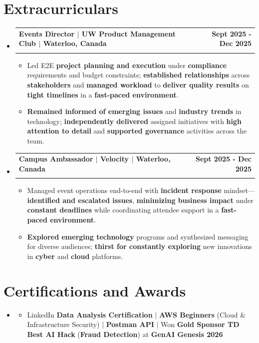 \documentclass[letterpaper,10pt]{article}
\makeatletter
\newcommand{\resumeItem}[1]{
  \item\small{
    {#1 \vspace{-1pt}}
  }
}
\newcommand{\resumeSubheading}[4]{
  \vspace{-1pt}\item
    \begin{tabular*}{1.0\textwidth}[t]{l@{\extracolsep{\fill}}r}
      \textbf{#1} & \textbf{\small #2} \\
      \textit{\small#3} & \textit{\small #4} \\[-2pt]
    \end{tabular*}\vspace{-7pt}
}
\newcommand{\resumeSubHeadingListStart}{\begin{itemize}[leftmargin=0.0in, label={}]}
\newcommand{\resumeSubHeadingListEnd}{\end{itemize}}
\newcommand{\resumeItemListStart}{\begin{itemize}[leftmargin=0.15in]}
\newcommand{\resumeItemListEnd}{\end{itemize}\vspace{-4pt}}
\makeatother
\begin{document}
\section{Extracurriculars}
  \resumeSubHeadingListStart
    \resumeSubheading
      {Events Director $|$ UW Product Management Club $|$ Waterloo, Canada}{Sept 2025 - Dec 2025}
      {}{}
      \vspace{-13pt}
      \resumeItemListStart
      \vspace{-2pt}
        \resumeItem{Led E2E \textbf{project planning and execution} under \textbf{compliance} requirements and budget constraints; \textbf{established relationships} across \textbf{stakeholders} and \textbf{managed workload} to \textbf{deliver quality results} on \textbf{tight timelines} in a \textbf{fast-paced environment}.}
        \vspace{-2pt}
        \resumeItem{\textbf{Remained informed of emerging issues} and \textbf{industry trends} in technology; \textbf{independently delivered} assigned initiatives with \textbf{high attention to detail} and \textbf{supported governance} activities across the team.}
      \resumeItemListEnd
      \vspace{-5pt}
    \resumeSubheading
      {Campus Ambassador $|$ Velocity $|$ Waterloo, Canada}{Sept 2025 - Dec 2025}
      {}{}
      \vspace{-13pt}
      \resumeItemListStart
      \vspace{-2pt}
        \resumeItem{Managed event operations end-to-end with \textbf{incident response} mindset---\textbf{identified and escalated issues}, \textbf{minimizing business impact} under \textbf{constant deadlines} while coordinating attendee support in a \textbf{fast-paced environment}.}
        \vspace{-2pt}
        \resumeItem{\textbf{Explored emerging technology} programs and synthesized messaging for diverse audiences; \textbf{thirst for constantly exploring} new innovations in \textbf{cyber} and \textbf{cloud} platforms.}
      \resumeItemListEnd
      \vspace{-2pt}
  \resumeSubHeadingListEnd
\vspace{-13pt}
\section{Certifications and Awards}
    \resumeSubHeadingListStart
      \item[]
          \resumeItemListStart
            \resumeItem{LinkedIn \textbf{Data Analysis Certification} $|$ \textbf{AWS Beginners} (Cloud \& Infrastructure Security) $|$ \textbf{Postman API} $|$ Won \textbf{Gold Sponsor TD Best AI Hack} (\textbf{Fraud Detection}) at \textbf{GenAI Genesis 2026}}
          \resumeItemListEnd
          \vspace{-8pt}
        
   \resumeSubHeadingListEnd
\end{document}

